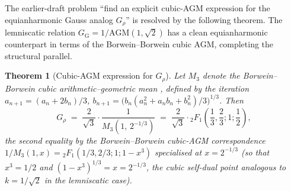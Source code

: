 \documentclass[11pt]{article}
\newtheorem{theorem}{Theorem}[section]
\theoremstyle{definition}
\theoremstyle{remark}
\newcommand{\GG}{G_{\!\scriptscriptstyle\mathrm{G}}}
\newcommand{\AGM}{\mathrm{AGM}}
\begin{document}
The earlier-draft problem ``find an explicit cubic-AGM expression for
the equianharmonic Gauss analog $G_\rho$'' is resolved by the following
theorem. The lemniscatic relation $\GG = 1/\AGM(1, \sqrt 2)$ has a
clean equianharmonic counterpart in terms of the Borwein--Borwein cubic
AGM, completing the structural parallel.

\begin{theorem}[Cubic-AGM expression for $G_\rho$]\label{thm:cubic-AGM-Grho}
Let $M_3$ denote the Borwein--Borwein cubic arithmetic--geometric mean
\cite{borwein-cubic-agm}, defined by the iteration
$a_{n+1} = (a_n + 2 b_n)/3$, $b_{n+1} = \bigl(b_n (a_n^2 + a_n b_n + b_n^2)/3\bigr)^{1/3}$.
Then
\[
G_\rho \;=\; \frac{2}{\sqrt 3} \cdot \frac{1}{M_3(1,\, 2^{-1/3})}
       \;=\; \frac{2}{\sqrt 3} \cdot {}_2F_1\!\left(\frac{1}{3}, \frac{2}{3}; 1; \frac{1}{2}\right),
\]
the second equality by the Borwein--Borwein cubic-AGM correspondence
$1/M_3(1, x) = {}_2F_1(1/3, 2/3; 1; 1 - x^3)$ specialised at
$x = 2^{-1/3}$ (so that $x^3 = 1/2$ and $(1 - x^3)^{1/3} = x = 2^{-1/3}$,
the cubic self-dual point analogous to $k = 1/\sqrt 2$ in the
lemniscatic case).
\end{theorem}
\end{document}
